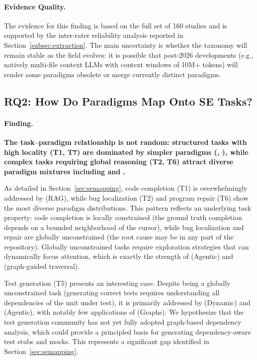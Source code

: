 \paragraph{Evidence Quality.}
The evidence for this finding is based on the full set of 160 studies and is supported by the
inter-rater reliability analysis reported in Section~\ref{subsec:extraction}. The main
uncertainty is whether the taxonomy will remain stable as the field evolves: it is possible
that post-2026 developments (e.g., natively multi-file context LLMs with context windows of
10M+ tokens) will render some paradigms obsolete or merge currently distinct paradigms.

\subsection{RQ2: How Do Paradigms Map Onto SE Tasks?}
\label{subsec:rq2}

\paragraph{Finding.}
\textbf{The task--paradigm relationship is not random: structured tasks with high locality
(T1, T7) are dominated by simpler paradigms (, ), while complex tasks
requiring global reasoning (T2, T6) attract diverse paradigm mixtures including 
and .}

As detailed in Section~\ref{sec:semapping}, code completion (T1) is overwhelmingly addressed
by  (RAG), while bug localization (T2) and program repair (T6) show the most diverse
paradigm distributions. This pattern reflects an underlying task property: code completion is
locally constrained (the ground truth completion depends on a bounded neighborhood of the
cursor), while bug localization and repair are globally unconstrained (the root cause may be
in any part of the repository). Globally unconstrained tasks require exploration strategies
that can dynamically focus attention, which is exactly the strength of  (Agentic)
and  (graph-guided traversal).

Test generation (T5) presents an interesting case. Despite being a globally unconstrained task
(generating correct tests requires understanding all dependencies of the unit under test),
it is primarily addressed by  (Dynamic) and  (Agentic), with notably few
applications of  (Graphs). We hypothesize that the test generation community has
not yet fully adopted graph-based dependency analysis, which could provide a principled
basis for generating dependency-aware test stubs and mocks. This represents a significant
gap identified in Section~\ref{sec:semapping}.

